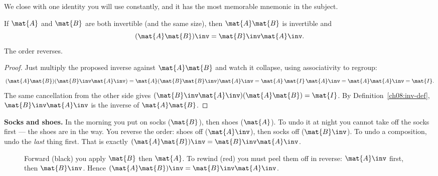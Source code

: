 We close with one identity you will use constantly, and it has the most memorable mnemonic
in the subject.

\begin{theorem}
\label{ch08:abinv}
If $\mat{A}$ and $\mat{B}$ are both invertible (and the same size), then $\mat{A}\mat{B}$
is invertible and
\[
(\mat{A}\mat{B})\inv = \mat{B}\inv \mat{A}\inv.
\]
The order reverses.
\end{theorem}

\begin{proof}
Just multiply the proposed inverse against $\mat{A}\mat{B}$ and watch it collapse, using
associativity to regroup:
\[
(\mat{A}\mat{B})(\mat{B}\inv\mat{A}\inv)
= \mat{A}(\mat{B}\mat{B}\inv)\mat{A}\inv
= \mat{A}\,\mat{I}\,\mat{A}\inv
= \mat{A}\mat{A}\inv = \mat{I}.
\]
The same cancellation from the other side gives
$(\mat{B}\inv\mat{A}\inv)(\mat{A}\mat{B}) = \mat{I}$. By
Definition~\ref{ch08:inv-def}, $\mat{B}\inv\mat{A}\inv$ is the inverse of $\mat{A}\mat{B}$.
\end{proof}

\begin{intuitionbox}
\textbf{Socks and shoes.} In the morning you put on socks ($\mat{B}$), then shoes
($\mat{A}$). To undo it at night you cannot take off the socks first --- the shoes are in
the way. You reverse the order: shoes off ($\mat{A}\inv$), then socks off ($\mat{B}\inv$).
To undo a composition, undo the \emph{last} thing first. That is exactly
$(\mat{A}\mat{B})\inv = \mat{B}\inv\mat{A}\inv$.
\end{intuitionbox}

\begin{figure}[H]
\centering
{}
\caption{Forward (black) you apply $\mat{B}$ then $\mat{A}$. To rewind (red) you must
peel them off in reverse: $\mat{A}\inv$ first, then $\mat{B}\inv$. Hence
$(\mat{A}\mat{B})\inv = \mat{B}\inv\mat{A}\inv$.}
\label{ch08:socksshoes}
\end{figure}

